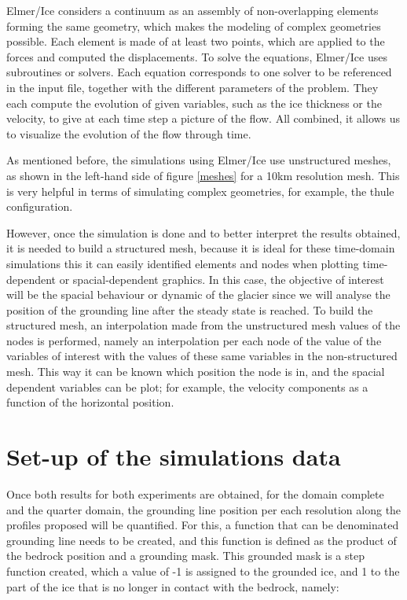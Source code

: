 \documentclass{article}
\begin{document}
Elmer/Ice considers a continuum as an assembly of non-overlapping elements forming the same geometry, which makes the modeling of complex geometries possible. Each element is made of at least two points, which are applied to the forces and computed the displacements. To solve the equations, Elmer/Ice uses subroutines or solvers. Each equation corresponds to one solver to be referenced in the input file, together with the different parameters of the problem. They each compute the evolution of given variables, such as the ice thickness or the velocity, to give at each time step a picture of the flow. All combined, it allows us to visualize the evolution of the flow through time.
 
As mentioned before, the simulations using Elmer/Ice use unstructured meshes, as shown in the left-hand side of figure \ref{meshes} for a 10km resolution mesh. This is very helpful in terms of simulating complex geometries, for example, the thule configuration.


However, once the simulation is done and to better interpret the results obtained, it is needed to build a structured mesh, because it is ideal for these time-domain simulations this it can  easily identified elements and nodes when plotting time-dependent or spacial-dependent graphics. In this case, the objective of interest will be the spacial behaviour or dynamic of the glacier since we will analyse the position of the grounding line after the steady state is reached. To build the structured mesh, an interpolation made from the unstructured mesh values of the nodes is performed, namely an interpolation per each node of the value of the variables of interest with the values of these same variables in the non-structured mesh. This way it can be known which position the node is in, and the spacial dependent variables can be plot; for example, the velocity components as a function of the horizontal position. 

\section{Set-up of the simulations data}
Once both results for both experiments are obtained, for the domain complete and the quarter domain, the grounding line position per each resolution along the profiles proposed will be quantified. For this, a function that can be denominated grounding line needs to be created, and this function is defined as the product of the bedrock position and a grounding mask. This grounded mask is a step function created, which a value of -1 is assigned to the grounded ice, and 1 to the part of the ice that is no longer in contact with the bedrock, namely:
\end{document}
